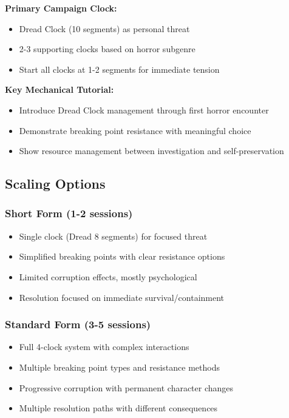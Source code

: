 \documentclass[11pt]{article}
\begin{document}
\textbf{Primary Campaign Clock:}
\begin{itemize}
\item Dread Clock (10 segments) as personal threat
\item 2-3 supporting clocks based on horror subgenre
\item Start all clocks at 1-2 segments for immediate tension
\end{itemize}

\textbf{Key Mechanical Tutorial:}
\begin{itemize}
\item Introduce Dread Clock management through first horror encounter
\item Demonstrate breaking point resistance with meaningful choice
\item Show resource management between investigation and self-preservation
\end{itemize}

\subsection{Scaling Options}

\subsubsection{Short Form (1-2 sessions)}

\begin{itemize}
\item Single clock (Dread 8 segments) for focused threat
\item Simplified breaking points with clear resistance options
\item Limited corruption effects, mostly psychological
\item Resolution focused on immediate survival/containment
\end{itemize}

\subsubsection{Standard Form (3-5 sessions)}

\begin{itemize}
\item Full 4-clock system with complex interactions
\item Multiple breaking point types and resistance methods
\item Progressive corruption with permanent character changes
\item Multiple resolution paths with different consequences
\end{itemize}
\end{document}
